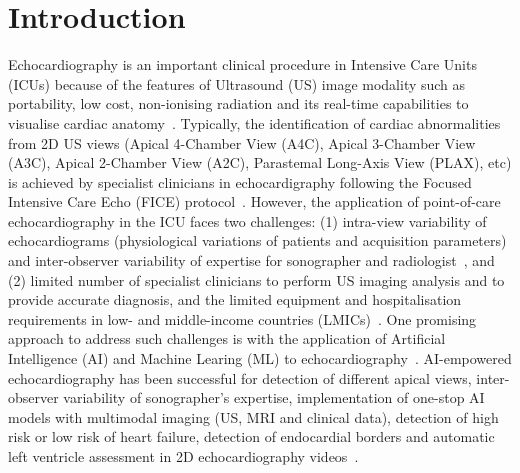 \documentclass[mlabstract,twocolumn]{jmlr}
\begin{document}
\section{Introduction}
\label{sec:intro}
Echocardiography is an important clinical procedure in Intensive Care Units (ICUs) because of the features of Ultrasound (US) image modality such as portability, low cost, non-ionising radiation and its real-time capabilities to visualise cardiac anatomy~\citep{Feigenbaum1996, Vieillard-Baron2008, singh2007, cambell2018}.
Typically, the identification of cardiac abnormalities from 2D US views (Apical 4-Chamber View (A4C), Apical 3-Chamber View (A3C), Apical 2-Chamber View (A2C), Parastemal Long-Axis View (PLAX), etc) is achieved by specialist clinicians in echocardigraphy following the Focused Intensive Care Echo (FICE) protocol~\citep{2017_hall_JIntensiveCareSociety}. %
However, the application of point-of-care echocardiography in the ICU faces two challenges:
(1) intra-view variability of echocardiograms (physiological variations of patients and acquisition parameters) and inter-observer variability of expertise for sonographer and radiologist~\citep{khamis2017, Feigenbaum1996, field2011}, and
(2) limited number of specialist clinicians to perform US imaging analysis and to provide accurate diagnosis, and the limited equipment and hospitalisation requirements in low- and middle-income countries (LMICs)~\citep{hao2021-wellcome, 2021-huyNhat-vanHao-in-FAIR-MICCAI, 2016_becker_in_TropicalMedicineInternationalHealth}.
One promising approach to address such challenges is with the application of Artificial Intelligence (AI) and Machine Learing (ML) to echocardiography~\citep{2022asch_AmericanSocietyofEchocardiography}.
AI-empowered echocardiography has been successful for detection of different apical views, inter-observer variability of sonographer's expertise, implementation of one-stop AI models with multimodal imaging (US, MRI and clinical data), detection of high risk or low risk of heart failure, detection of endocardial borders and automatic left ventricle assessment in 2D echocardiography videos~\citep{tromp2022, zhang2022-mdpi, behnami2020, ono2022}.
\end{document}
